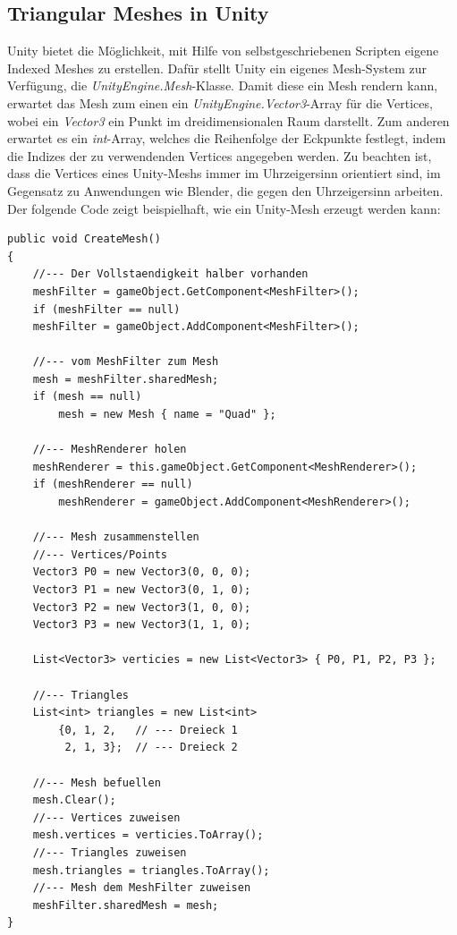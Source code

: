 \subsection{Triangular Meshes in Unity}
Unity bietet die M\"oglichkeit, mit Hilfe von selbstgeschriebenen Scripten eigene Indexed Meshes zu erstellen. Daf\"ur stellt Unity ein eigenes Mesh-System zur Verf\"ugung, die \textit{UnityEngine.Mesh}-Klasse. Damit diese ein Mesh rendern kann, erwartet das Mesh zum einen ein \textit{UnityEngine.Vector3}-Array f\"ur die Vertices, wobei ein \textit{Vector3} ein Punkt im dreidimensionalen Raum darstellt. Zum anderen erwartet es ein \textit{int}-Array, welches die Reihenfolge der Eckpunkte festlegt, indem die Indizes der zu verwendenden Vertices angegeben werden. Zu beachten ist, dass die Vertices eines Unity-Meshs immer im Uhrzeigersinn orientiert sind, im Gegensatz zu Anwendungen wie Blender, die gegen den Uhrzeigersinn arbeiten.  
Der folgende Code zeigt beispielhaft, wie ein Unity-Mesh erzeugt werden kann:\\
\begin{lstlisting}
public void CreateMesh()
{
	//--- Der Vollstaendigkeit halber vorhanden
	meshFilter = gameObject.GetComponent<MeshFilter>();
	if (meshFilter == null)
	meshFilter = gameObject.AddComponent<MeshFilter>();

	//--- vom MeshFilter zum Mesh
	mesh = meshFilter.sharedMesh;
	if (mesh == null)
		mesh = new Mesh { name = "Quad" };

	//--- MeshRenderer holen
	meshRenderer = this.gameObject.GetComponent<MeshRenderer>();
	if (meshRenderer == null)
		meshRenderer = gameObject.AddComponent<MeshRenderer>();

	//--- Mesh zusammenstellen
	//--- Vertices/Points
	Vector3 P0 = new Vector3(0, 0, 0);
	Vector3 P1 = new Vector3(0, 1, 0);
	Vector3 P2 = new Vector3(1, 0, 0);
	Vector3 P3 = new Vector3(1, 1, 0);

	List<Vector3> verticies = new List<Vector3> { P0, P1, P2, P3 };

	//--- Triangles
	List<int> triangles = new List<int> 
		{0, 1, 2, 	// --- Dreieck 1
		 2, 1, 3};	// --- Dreieck 2

	//--- Mesh befuellen
	mesh.Clear();
	//--- Vertices zuweisen
	mesh.vertices = verticies.ToArray();
	//--- Triangles zuweisen
	mesh.triangles = triangles.ToArray();
	//--- Mesh dem MeshFilter zuweisen
	meshFilter.sharedMesh = mesh;
}
\end{lstlisting}

